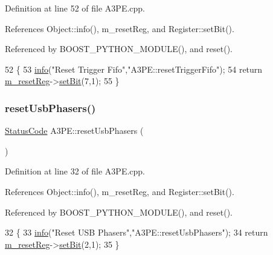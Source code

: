 Definition at line 52 of file A3\+P\+E.\+cpp.



References Object\+::info(), m\+\_\+reset\+Reg, and Register\+::set\+Bit().



Referenced by B\+O\+O\+S\+T\+\_\+\+P\+Y\+T\+H\+O\+N\+\_\+\+M\+O\+D\+U\+L\+E(), and reset().


\begin{DoxyCode}
52                                  \{
53   \hyperlink{classObject_a644fd329ea4cb85f54fa6846484b84a8}{info}(\textcolor{stringliteral}{"Reset Trigger Fifo"},\textcolor{stringliteral}{"A3PE::resetTriggerFifo"});
54   \textcolor{keywordflow}{return} \hyperlink{classA3PE_ab4db5f00976e5095686f108c8febf702}{m\_resetReg}->\hyperlink{classRegister_ab094246dd12aa7e0aa0ca917f4e70b31}{setBit}(7,1);
55 \}
\end{DoxyCode}
\mbox{\label{classA3PE_a0ad1110ea755ffd0b277284d807a8794}} 
\subsubsection{\texorpdfstring{reset\+Usb\+Phasers()}{resetUsbPhasers()}}
{\footnotesize\ttfamily \hyperlink{classStatusCode}{Status\+Code} A3\+P\+E\+::reset\+Usb\+Phasers (\begin{DoxyParamCaption}{ }\end{DoxyParamCaption})}



Definition at line 32 of file A3\+P\+E.\+cpp.



References Object\+::info(), m\+\_\+reset\+Reg, and Register\+::set\+Bit().



Referenced by B\+O\+O\+S\+T\+\_\+\+P\+Y\+T\+H\+O\+N\+\_\+\+M\+O\+D\+U\+L\+E(), and reset().


\begin{DoxyCode}
32                                 \{
33   \hyperlink{classObject_a644fd329ea4cb85f54fa6846484b84a8}{info}(\textcolor{stringliteral}{"Reset USB Phasers"},\textcolor{stringliteral}{"A3PE::resetUsbPhasers"});
34   \textcolor{keywordflow}{return} \hyperlink{classA3PE_ab4db5f00976e5095686f108c8febf702}{m\_resetReg}->\hyperlink{classRegister_ab094246dd12aa7e0aa0ca917f4e70b31}{setBit}(2,1);
35 \}
\end{DoxyCode}
\mbox{\label{classA3PE_acce23c9abd4f434c8c5965351f5ceef0}} 
